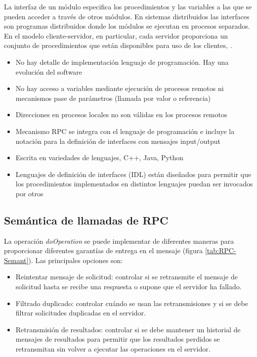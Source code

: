 La interfaz de un módulo especifica los procedimientos y las variables a las que se pueden acceder a trav\'es de  otros módulos. 
En sistemas distribuidos las interfaces son  programas distribuidos donde los módulos se ejecutan en procesos separados.
En el modelo cliente-servidor, en particular, cada servidor proporciona un conjunto de procedimientos que están disponibles para uso de los clientes,  .
\begin{itemize}
	\item No hay detalle de implementación lenguaje de programación. Hay una evolución del software
	\item No hay acceso a variables mediante ejecución de procesos remotos ni mecanismos pase de parámetros (llamada por valor o referencia)
	\item  Direcciones en procesos locales no son válidas en los procesos remotos
	
	\item  Mecanismo RPC se integra con el lenguaje de programación e incluye la notación  para la definición de interfaces con mensajes input/output
	\item Escrita en variedades de lenguajes, C++, Java, Python
	\item Lenguajes de definición de interfaces (IDL) están diseñados para permitir que los procedimientos implementados en distintos lenguajes puedan ser invocados por otros
	
\end{itemize}

\subsection{Semántica de llamadas de RPC}

La operaci\'on \textit{doOperation} se puede implementar de diferentes maneras para proporcionar diferentes garantías de entrega en el mensaje (figura \ref{tab:RPC-Semant}). Las principales opciones son:
\begin{itemize}
	\item Reintentar mensaje de solicitud: controlar si se retransmite el mensaje de solicitud hasta se recibe una respuesta o supone que el servidor ha fallado. 
	\item Filtrado duplicado: controlar cuándo se usan las retransmisiones y si se debe filtrar solicitudes duplicadas en el servidor. 
	\item Retransmisión de resultados: controlar si se debe mantener un historial de mensajes de resultados para permitir que los resultados perdidos se retransmitan sin volver a ejecutar las operaciones en el servidor.
\end{itemize}

